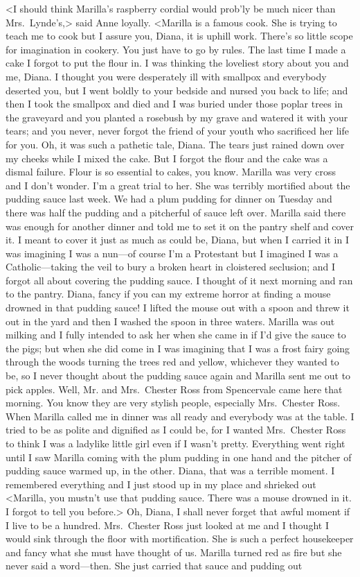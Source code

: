 <I should think Marilla's raspberry cordial would prob'ly be much nicer than Mrs.~Lynde's,> said Anne loyally. <Marilla is a famous cook. She is trying to teach me to cook but I assure you, Diana, it is uphill work. There's so little scope for imagination in cookery. You just have to go by rules. The last time I made a cake I forgot to put the flour in. I was thinking the loveliest story about you and me, Diana. I thought you were desperately ill with smallpox and everybody deserted you, but I went boldly to your bedside and nursed you back to life; and then I took the smallpox and died and I was buried under those poplar trees in the graveyard and you planted a rosebush by my grave and watered it with your tears; and you never, never forgot the friend of your youth who sacrificed her life for you. Oh, it was such a pathetic tale, Diana. The tears just rained down over my cheeks while I mixed the cake. But I forgot the flour and the cake was a dismal failure. Flour is so essential to cakes, you know. Marilla was very cross and I don't wonder. I'm a great trial to her. She was terribly mortified about the pudding sauce last week. We had a plum pudding for dinner on Tuesday and there was half the pudding and a pitcherful of sauce left over. Marilla said there was enough for another dinner and told me to set it on the pantry shelf and cover it. I meant to cover it just as much as could be, Diana, but when I carried it in I was imagining I was a nun—of course I'm a Protestant but I imagined I was a Catholic—taking the veil to bury a broken heart in cloistered seclusion; and I forgot all about covering the pudding sauce. I thought of it next morning and ran to the pantry. Diana, fancy if you can my extreme horror at finding a mouse drowned in that pudding sauce! I lifted the mouse out with a spoon and threw it out in the yard and then I washed the spoon in three waters. Marilla was out milking and I fully intended to ask her when she came in if I'd give the sauce to the pigs; but when she did come in I was imagining that I was a frost fairy going through the woods turning the trees red and yellow, whichever they wanted to be, so I never thought about the pudding sauce again and Marilla sent me out to pick apples. Well, Mr. and Mrs.~Chester Ross from Spencervale came here that morning. You know they are very stylish people, especially Mrs.~Chester Ross. When Marilla called me in dinner was all ready and everybody was at the table. I tried to be as polite and dignified as I could be, for I wanted Mrs.~Chester Ross to think I was a ladylike little girl even if I wasn't pretty. Everything went right until I saw Marilla coming with the plum pudding in one hand and the pitcher of pudding sauce warmed up, in the other. Diana, that was a terrible moment. I remembered everything and I just stood up in my place and shrieked out <Marilla, you mustn't use that pudding sauce. There was a mouse drowned in it. I forgot to tell you before.> Oh, Diana, I shall never forget that awful moment if I live to be a hundred. Mrs.~Chester Ross just looked at me and I thought I would sink through the floor with mortification. She is such a perfect housekeeper and fancy what she must have thought of us. Marilla turned red as fire but she never said a word—then. She just carried that sauce and pudding out 